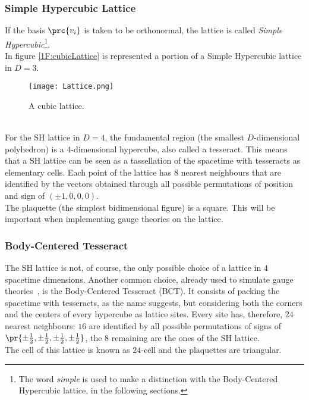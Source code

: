 \subsubsection{Simple Hypercubic Lattice}
If the basis $\prc{v_i}$ is taken to be orthonormal, the lattice is called \emph{Simple Hypercubic}\footnote{The word \emph{simple} is used to make a distinction with the Body-Centered Hypercubic lattice, in the following sections.}.\\
In figure \eqref{1F:cubicLattice} is represented a portion of a Simple Hypercubic lattice in $D=3$.
\begin{figure}[h!]
    \centering
    \texttt{[image: Lattice.png]}
    \caption{A cubic lattice.}
    \label{1F:cubicLattice}
\end{figure}\\
For the SH lattice in $D=4$, the fundamental region (the smallest $D$-dimensional polyhedron) is a $4$-dimensional hypercube, also called a tesseract.
This means that a SH lattice can be seen as a tassellation of the spacetime with tesseracts as elementary cells.
Each point of the lattice has $8$ nearest neighbours that are identified by the vectors obtained through all possible permutations of position and sign of $(\pm1,0,0,0)$.\\
The plaquette (the simplest bidimensional figure) is a square.
This will be important when implementing gauge theories on the lattice.

\subsubsection{Body-Centered Tesseract}
The SH lattice is not, of course, the only possible choice of a lattice in $4$ spacetime dimensions.
Another common choice, already used to simulate gauge theories~\cite{Celmaster:1982ht}, is the Body-Centered Tesseract (BCT).
It consists of packing the spacetime with tesseracts, as the name suggests, but considering both the corners and the centers of every hypercube as lattice sites.
Every site has, therefore, $24$ nearest neighbours: $16$ are identified by all possible permutations of signs of $\pr{\pm\frac12,\pm\frac12,\pm\frac12,\pm\frac12}$, the $8$ remaining are the ones of the SH lattice.\\
The cell of this lattice is known as $24$-cell and the plaquettes are triangular.

